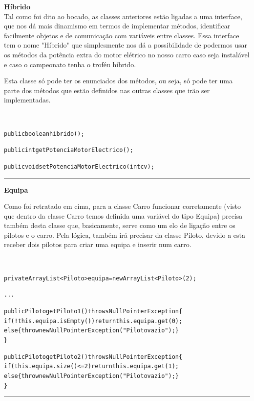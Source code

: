 \documentclass[10pt]{article}
\newenvironment{code}                    
{\textbf{
} \hspace{1cm} \hrulefill \\ 
\smallskip 
\begin{center}
\begin{minipage}{0.9\textwidth} 
\begin{alltt}\small}
{\end{alltt}
\end{minipage}
\end{center}
\hrule\smallskip
}
\begin{document}
\pagebreak

\textbf{Híbrido}
\\
Tal como foi dito ao bocado, as classes anteriores estão ligadas a uma interface, que nos dá mais dinamismo em termos de implementar métodos, identificar facilmente objetos e de comunicação com variáveis entre classes.
Essa interface tem o nome "Híbrido" que simplesmente nos dá a possibilidade de podermos usar os métodos da potência extra do motor elétrico no nosso carro caso seja instalável e caso o campeonato tenha o troféu híbrido.

Esta classe só pode ter os enunciados dos métodos, ou seja, só pode ter uma parte dos métodos que estão definidos nas outras classes que irão ser implementadas.

\begin{code}

public boolean hibrido ();
    
public int getPotenciaMotorElectrico();
    
public void setPotenciaMotorElectrico(int cv);

\end{code}


\textbf{Equipa}

Como foi retratado em cima, para a classe Carro funcionar corretamente (visto que dentro da classe Carro temos definida uma variável do tipo Equipa) precisa também desta classe que, basicamente, serve como um elo de ligação entre os pilotos e o carro. Pela lógica, também irá precisar da classe Piloto, devido a esta receber dois pilotos para criar uma equipa e inserir num carro.

\begin{code}
private ArrayList <Piloto> equipa = new ArrayList <Piloto> (2);

...

public Piloto getPiloto1 () throws NullPointerException \{
        if (!this.equipa.isEmpty()) return this.equipa.get(0);
        else \{throw new NullPointerException ("Piloto vazio");\}
    \}

public Piloto getPiloto2 () throws NullPointerException \{
        if (this.equipa.size()<=2) return this.equipa.get(1);
        else \{throw new NullPointerException ("Piloto vazio");\}
    \}

\end{code}
\end{document}
